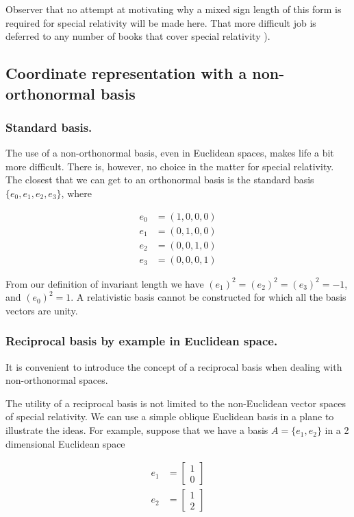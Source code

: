 \documentclass[iop,onecolumn]{emulateapj}
\begin{document}
Observer that no attempt at motivating why a mixed sign length of this form is required for special relativity will be made here.  That more difficult job is deferred to any number of books that cover special relativity \citep{landau1980classical}).

\subsection{Coordinate representation with a non-orthonormal basis}

\subsubsection{Standard basis.}

The use of a non-orthonormal basis, even in Euclidean spaces, makes life a bit more difficult.  There is, however, no choice in the matter for special relativity.  The closest that we can get to an orthonormal basis is the standard basis $\{e_0, e_1, e_2, e_3\}$, where

\begin{equation}\label{eqn:grahamSchmidtLorentz:70}
\begin{aligned}
e_0 &= (1, 0, 0, 0) \\
e_1 &= (0, 1, 0, 0) \\
e_2 &= (0, 0, 1, 0) \\
e_3 &= (0, 0, 0, 1)
\end{aligned}
\end{equation}

From our definition of invariant length we have $(e_1)^2 = (e_2)^2 = (e_3)^2 = -1$, and $(e_0)^2 = 1$.  A relativistic basis cannot be constructed for which all the basis vectors are unity.

\subsubsection{Reciprocal basis by example in Euclidean space.}

It is convenient to introduce the concept of a reciprocal basis when dealing with non-orthonormal spaces.

The utility of a reciprocal basis is not limited to the non-Euclidean vector spaces of special relativity.  We can use a simple oblique Euclidean basis in a plane to illustrate the ideas.  For example, suppose that we have a basis $A = \{e_1, e_2\}$ in a 2 dimensional Euclidean space

\begin{equation}\label{eqn:grahamSchmidtLorentz:90}
\begin{aligned}
e_1 &=
\begin{bmatrix}
1 \\
0
\end{bmatrix} \\
e_2 &=
\begin{bmatrix}
1 \\
2
\end{bmatrix}
\end{aligned}
\end{equation}
\end{document}
